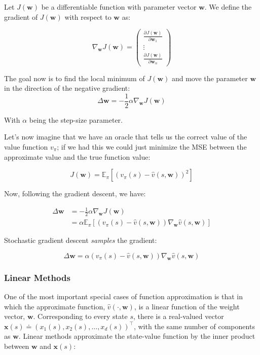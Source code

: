 Let $J(\mathbf{w})$ be a differentiable function with parameter vector $\mathbf{w}$. We define the gradient of $J(\mathbf{w})$ with respect to $\mathbf{w}$ as:

\[
\nabla_{\mathbf{w}} J(\mathbf{w}) = 
\begin{pmatrix}
\frac{\partial J(\mathbf{w})}{\partial \mathbf{w}_1} \\
\vdots \\
\frac{\partial J(\mathbf{w})}{\partial \mathbf{w}_n}
\end{pmatrix}
\]

The goal now is to find the local minimum of $J(\mathbf{w})$ and move the parameter $\mathbf{w}$ in the direction of the negative gradient:
\[
    \Delta \mathbf{w} = - \frac{1}{2} \alpha \nabla_{\mathbf{w}} J(\mathbf{w})
\]

With $\alpha$ being the step-size parameter.

Let's now imagine that we have an oracle that tells us the correct value of the value function $v_\pi$; if we had this we could just minimize the MSE between the approximate value and the true function value:

\[
    J(\mathbf{w}) = \mathbb{E}_\pi \left[ (v_\pi(s) - \hat{v}(s,\mathbf{w}))^2 \right]
\]

Now, following the gradient descent, we have:

\begin{align*}
    \Delta \mathbf{w} &= - \frac{1}{2} \alpha \nabla_{\mathbf{w}} J(\mathbf{w}) \\
                      &= \alpha \mathbb{E}_\pi \left[ ( v_\pi(s) - \hat{v}(s, \mathbf{w}) ) \nabla_{\mathbf{w}} \hat{v}(s,\mathbf{w}) \right]
\end{align*}

Stochastic gradient descent \emph{samples} the gradient:

\[
    \Delta \mathbf{w} = \alpha \left( v_\pi(s) - \hat{v}(s, \mathbf{w}) \right) \nabla_{\mathbf{w}} \hat{v}(s, \mathbf{w})
\]

\subsubsection{Linear Methods}
One of the most important special cases of function approximation is that in which the approximate function, $\hat{v}(\cdot, \mathbf{w})$, is a linear function of the weight vector, $\mathbf{w}$. Corresponding to every state $s$, there is a real-valued vector $\mathbf{x}(s) \doteq (x_1(s), x_2(s), \dots, x_d(s))^\top$, with the same number of components as $\mathbf{w}$. Linear methods approximate the state-value function by the inner product between $\mathbf{w}$ and $\mathbf{x}(s)$:


